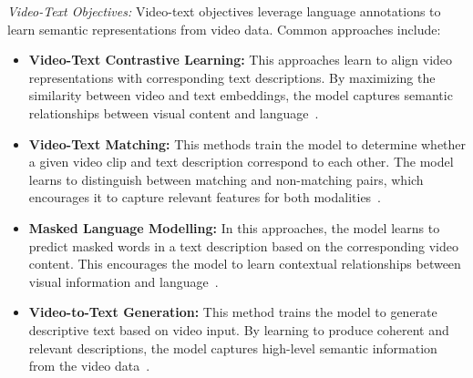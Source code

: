 \textit{Video-Text Objectives:} Video-text objectives leverage language annotations to learn semantic representations from video data. Common approaches include:
\begin{itemize}
    \item \textbf{Video-Text Contrastive Learning:} This approaches learn to align video representations with corresponding text descriptions. By maximizing the similarity between video and text embeddings, the model captures semantic relationships between visual content and language~\cite{Xu2021VideoCLIPCP, Zhao2024VideoPrismAF, Wang2023InternVidAL, Papalampidi2023ASR, Li2023UnmaskedTT}.
    
    \item \textbf{Video-Text Matching:} This methods train the model to determine whether a given video clip and text description correspond to each other. The model learns to distinguish between matching and non-matching pairs, which encourages it to capture relevant features for both modalities~\cite{Li2023UnmaskedTT}.

    \item \textbf{Masked Language Modelling:} In this approaches, the model learns to predict masked words in a text description based on the corresponding video content. This encourages the model to learn contextual relationships between visual information and language~\cite{Li2023UnmaskedTT}.

    \item \textbf{Video-to-Text Generation:} This method trains the model to generate descriptive text based on video input. By learning to produce coherent and relevant descriptions, the model captures high-level semantic information from the video data~\cite{Papalampidi2023ASR, Yan2022VideoCoCaVM}.
\end{itemize}


